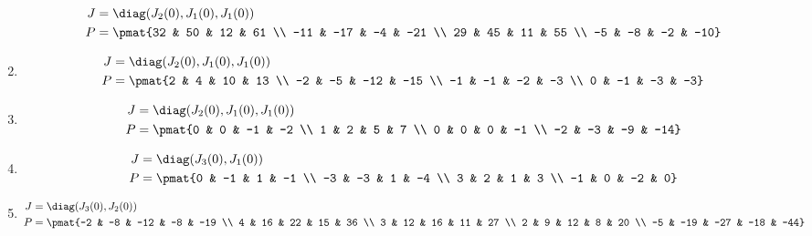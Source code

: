 \begin{enumerate}
\begin{align*}
J &= \diag(J_{2}(0), J_{1}(0), J_{1}(0))\\
P &= \pmat{32 & 50 & 12 & 61 \\ -11 & -17 & -4 & -21 \\ 29 & 45 & 11 & 55 \\ -5 & -8 & -2 & -10}
\end{align*}

\item

\begin{align*}
J &= \diag(J_{2}(0), J_{1}(0), J_{1}(0))\\
P &= \pmat{2 & 4 & 10 & 13 \\ -2 & -5 & -12 & -15 \\ -1 & -1 & -2 & -3 \\ 0 & -1 & -3 & -3}
\end{align*}

\item

\begin{align*}
J &= \diag(J_{2}(0), J_{1}(0), J_{1}(0))\\
P &= \pmat{0 & 0 & -1 & -2 \\ 1 & 2 & 5 & 7 \\ 0 & 0 & 0 & -1 \\ -2 & -3 & -9 & -14}
\end{align*}

\item

\begin{align*}
J &= \diag(J_{3}(0), J_{1}(0))\\
P &= \pmat{0 & -1 & 1 & -1 \\ -3 & -3 & 1 & -4 \\ 3 & 2 & 1 & 3 \\ -1 & 0 & -2 & 0}
\end{align*}

\item

\begin{align*}
J &= \diag(J_{3}(0), J_{2}(0))\\
P &= \pmat{-2 & -8 & -12 & -8 & -19 \\ 4 & 16 & 22 & 15 & 36 \\ 3 & 12 & 16 & 11 & 27 \\ 2 & 9 & 12 & 8 & 20 \\ -5 & -19 & -27 & -18 & -44}
\end{align*}


\end{enumerate}
